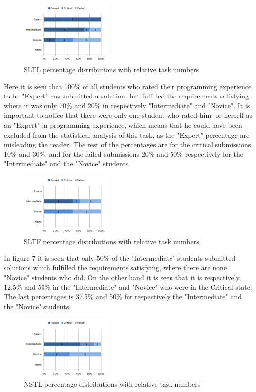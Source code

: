 \documentclass{sig-alternate-05-2015}
\begin{document}
\begin{figure}[H]
	\centering
	\includegraphics[width=0.4\textwidth]{img06}
	\caption{SLTL percentage distributions with relative task numbers}
\end{figure}

Here it is seen that 100\% of all students who rated their programming experience to be "Expert" has submitted a solution that fulfilled the requirements satisfying, where it was only 70\% and 20\% in respectively "Intermediate" and "Novice".
It is important to notice that there were only one student who rated him- or herself as an "Expert" in programming experience, which means that he could have been excluded from the statistical analysis of this task, as the "Expert" percentage are misleading the reader. The rest of the percentages are for the critical submissions 10\% and 30\%, and for the failed submissions 20\% and 50\% respectively for the "Intermediate" and the "Novice" students.

\begin{figure}[H]
	\centering
	\includegraphics[width=0.4\textwidth]{img07}
	\caption{SLTF percentage distributions with relative task numbers}
\end{figure}

In figure 7 it is seen that only 50\% of the "Intermediate" students submitted solutions which fulfilled the requirements satisfying, where there are none "Novice" students who did. On the other hand it is seen that it is respectively 12.5\% and 50\% in the "Intermediate" and "Novice" who were in the Critical state. The last percentages is 37.5\% and 50\% for respectively the "Intermediate" and the "Novice" students.

\begin{figure}[H]
	\centering
	\includegraphics[width=0.4\textwidth]{img08}
	\caption{NSTL percentage distributions with relative task numbers}
\end{figure}
\end{document}
